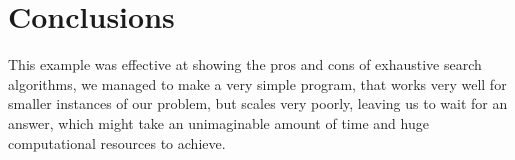 \documentclass[...]{revdetua}
\begin{document}
\section{Conclusions}
This example was effective at showing the pros and cons of exhaustive search algorithms, we managed to make a very simple program, that works very well for smaller instances of our problem, but scales very poorly, leaving us to wait for an answer, which might take an unimaginable amount of time and huge computational resources to achieve.




\end{document}

